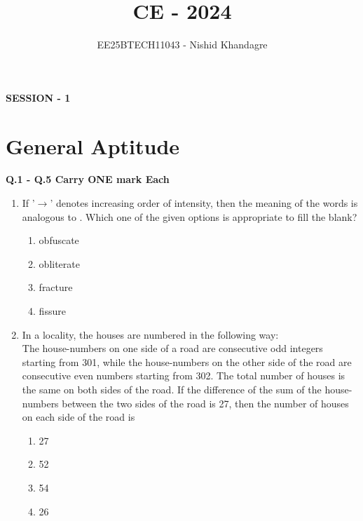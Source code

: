 \documentclass[journal,12pt,onecolumn]{article}
\theoremstyle{remark}
\begin{document}
\title{CE - 2024}
\author{EE25BTECH11043 - Nishid Khandagre}
\date{}
\maketitle

\renewcommand{\thefigure}{\theenumi}
\renewcommand{\thetable}{\theenumi}

\textbf{SESSION - 1}

\section*{General Aptitude }
\textbf{Q.1 - Q.5 Carry ONE mark Each}

\begin{enumerate}
    \item If '$\rightarrow$' denotes increasing order of intensity, then the meaning of the words
     is analogous to .
    Which one of the given options is appropriate to fill the blank?

    \hfill{}
    \begin{enumerate}
        \item obfuscate
        \item obliterate
        \item fracture
        \item fissure
    \end{enumerate}

    \item In a locality, the houses are numbered in the following way:\\
    The house-numbers on one side of a road are consecutive odd integers starting from 301, while the house-numbers on the other side of the road are consecutive even numbers starting from 302. The total number of houses is the same on both sides of the road.
    If the difference of the sum of the house-numbers between the two sides of the road is 27, then the number of houses on each side of the road is

    \hfill{}
    \begin{enumerate}
        \item 27
        \item 52
        \item 54
        \item 26
    \end{enumerate}
    

\end{enumerate}
\end{document}
